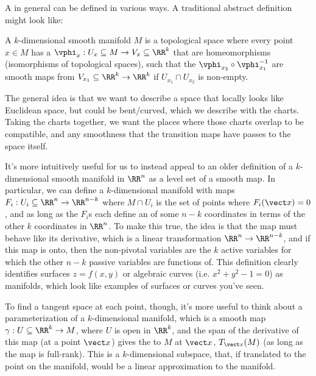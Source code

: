 \documentclass[12pt]{article}
\begin{document}
\noindent {} A
     in general can be defined in various ways. A traditional
    abstract definition might look like: 
    \begin{definition*}
      A $k$-dimensional smooth manifold $M$ is a topological space where every point $x \in M$ has a
       $\vphi_x : U_x \subseteq M \to V_x \subseteq \RR^k$ that are
      homeomorphisms (isomorphisms of topological spaces), such that the  $\vphi_{x_2} \circ \vphi_{x_1}^{-1}$ are smooth maps from
      $V_{x_1} \subseteq \RR^k \to \RR^k$ if $U_{x_1} \cap U_{x_2}$ is non-empty.  
    \end{definition*}
    The general idea is that we want to describe a space that locally looks
    like Euclidean space, but could be bent/curved, which we describe with
    the charts. Taking the charts together, we want the places where those
    charts overlap to be compatible, and any smoothness that the transition
    maps have passes to the space itself. 

    It's more intuitively useful for us to instead appeal to an older
    definition of a $k$-dimensional smooth manifold in $\RR^n$ as a level set of
    a smooth map. In particular, we can define a $k$-dimensional manifold with
    maps $F_i : U_i \subseteq \RR^n \to \RR^{n-k}$ where $M \cap U_i$ is the
    set of points where $F_i(\vect x) = 0$, and as long as the $F_i$s each define an
     of some $n-k$ coordinates in terms of
    the other $k$ coordinates in $\RR^n$. To make this true, the idea is that the map must behave like its
    derivative, which is a linear transformation $\RR^n \to \RR^{n-k}$, and if
    this map is onto, then the non-pivotal variables are the $k$ active variables
    for which the other $n - k$ passive variables are functions of. 
    This definition clearly identifies surfaces $z = f(x,y)$ or algebraic curves
    (i.e. $x^2 + y^2 - 1 = 0$) as manifolds, which look like examples of
    surfaces or curves you've seen. 

    To find a tangent space at each point, though, it's more useful to think
    about a parameterization of a $k$-dimensional manifold, which is a smooth map
    $\gamma : U \subseteq \RR^k \to M$, where $U$ is open in $\RR^k$, and the
    span of the derivative of this map (at a point $\vect x$) gives the  
    to $M$ at $\vect x$, $T_{\vect x}(M)$ (as long
    as the map is full-rank). This is a $k$-dimensional subspace, that, if
    translated to the point on the manifold, would be a linear approximation to
    the manifold.
\end{document}
